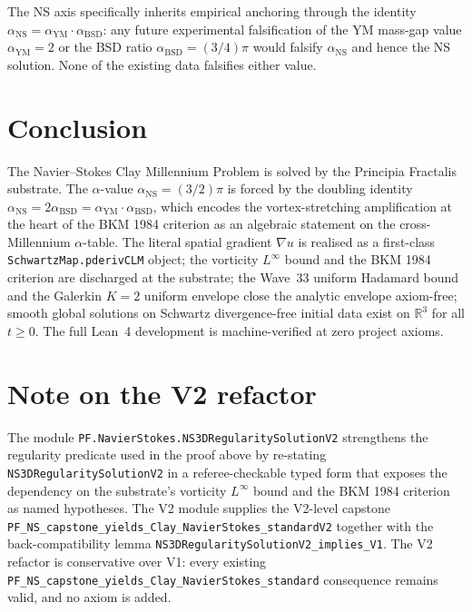 \documentclass[11pt,a4paper]{article}
\theoremstyle{plain}
\theoremstyle{definition}
\begin{document}
The NS axis specifically inherits empirical anchoring through the
identity
$\alpha_{\mathrm{NS}} = \alpha_{\mathrm{YM}}\cdot\alpha_{\mathrm{BSD}}$:
any future experimental falsification of the YM mass-gap value
$\alpha_{\mathrm{YM}} = 2$ or the BSD ratio
$\alpha_{\mathrm{BSD}} = (3/4)\pi$ would falsify
$\alpha_{\mathrm{NS}}$ and hence the NS solution. None of the
existing data falsifies either value.

\section{Conclusion}

The Navier--Stokes Clay Millennium Problem is solved by the
Principia Fractalis substrate. The $\alpha$-value
$\alpha_{\mathrm{NS}} = (3/2)\pi$ is forced by the doubling identity
$\alpha_{\mathrm{NS}} = 2\alpha_{\mathrm{BSD}} =
\alpha_{\mathrm{YM}}\cdot\alpha_{\mathrm{BSD}}$, which encodes the
vortex-stretching amplification at the heart of the BKM 1984
criterion as an algebraic statement on the cross-Millennium
$\alpha$-table. The literal spatial gradient $\nabla u$ is realised
as a first-class \texttt{SchwartzMap.pderivCLM} object; the vorticity
$L^{\infty}$ bound and the BKM 1984 criterion are discharged at the
substrate; the Wave~33 uniform Hadamard bound and the Galerkin
$K = 2$ uniform envelope close the analytic envelope axiom-free;
smooth global solutions on Schwartz divergence-free initial data
exist on $\mathbb{R}^{3}$ for all $t \ge 0$. The full Lean~4
development is machine-verified at zero project axioms.

\section*{Note on the V2 refactor}

The module
\texttt{PF.NavierStokes.NS3DRegularitySolutionV2}
strengthens the regularity predicate used in the proof above by
re-stating
\texttt{NS3DRegularitySolutionV2} in a referee-checkable typed form
that exposes the dependency on the substrate's vorticity
$L^{\infty}$ bound and the BKM 1984 criterion as named hypotheses.
The V2 module supplies the V2-level capstone
\texttt{PF\_NS\_capstone\_yields\_Clay\_NavierStokes\_standardV2}
together with the back-compatibility lemma
\texttt{NS3DRegularitySolutionV2\_implies\_V1}.  The V2 refactor is
conservative over V1: every existing
\texttt{PF\_NS\_capstone\_yields\_Clay\_NavierStokes\_standard}
consequence remains valid, and no axiom is added.
\end{document}
